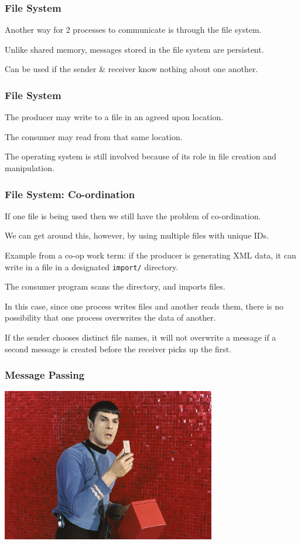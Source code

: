 \begin{frame}
	\frametitle{File System}

	Another way for 2 processes to communicate is through the file system.

	Unlike shared memory, messages stored in the file system are persistent.

	Can be used if the sender \& receiver know nothing about one another.

\end{frame}

\begin{frame}
	\frametitle{File System}

	The producer may write to a file in an agreed upon location.

	The consumer may read from that same location.

	The operating system is still involved because of its role in file creation and manipulation.

\end{frame}

\begin{frame}
	\frametitle{File System: Co-ordination}

	If one file is being used then we still have the problem of co-ordination.

	We can get around this, however, by using multiple files with unique IDs.

	Example from a co-op work term: if the producer is generating XML data, it can write in a file in a designated \texttt{import/} directory.

	The consumer program scans the directory, and imports files.

	In this case, since one process writes files and another reads them, there is no possibility that one process overwrites the data of another.

	If the sender chooses distinct file names, it will not overwrite a message if a second message is created before the receiver picks up the first.

\end{frame}


\begin{frame}
	\frametitle{Message Passing}

	\begin{center}
		\includegraphics[width=0.7\textwidth]{images/communicator.jpg}
	\end{center}

\end{frame}


